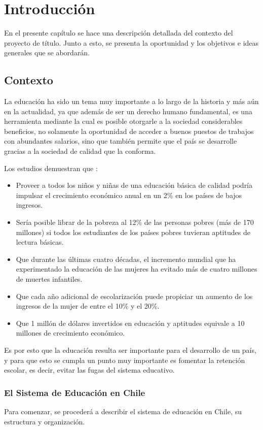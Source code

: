 \chapter{Introducción}
\label{ch:intro}
En el presente capítulo se hace una descripción detallada del contexto del proyecto de título. Junto a esto, se presenta la oportunidad y los objetivos e ideas generales que se abordarán.

\section{Contexto}
La educación ha sido un tema muy importante a lo largo de la historia y más aún en la actualidad, ya que además de ser un derecho humano fundamental, es una herramienta mediante la cual es posible otorgarle a la sociedad considerables beneficios, no solamente la oportunidad de acceder a buenos puestos de trabajos con abundantes salarios, sino que también permite que el país se desarrolle gracias a la sociedad de calidad que la conforma. 

Los estudios demuestran que \cite{unicef}:
\begin{itemize}
\item Proveer a todos los niños y niñas de una educación básica de calidad podría impulsar el crecimiento económico anual en un 2\% en los países de bajos ingresos.
\item Sería posible librar de la pobreza al 12\% de las personas pobres (más de 170 millones) si todos los estudiantes de los países pobres tuvieran aptitudes de lectura básicas.
\item Que durante las últimas cuatro décadas, el incremento mundial que ha experimentado la educación de las mujeres ha evitado más de cuatro millones de muertes infantiles.
\item Que cada año adicional de escolarización puede propiciar un aumento de los ingresos de la mujer de entre el 10\% y el 20\%.
\item Que 1 millón de dólares invertidos en educación y aptitudes equivale a 10 millones de crecimiento económico.
\end{itemize}

Es por esto que la educación resulta ser importante para el desarrollo de un país, y para que esto se cumpla un punto muy importante es fomentar la retención escolar, es decir, evitar las fugas del sistema educativo. 

\subsection{El Sistema de Educación en Chile}
Para comenzar, se procederá a describir el sistema de educación en Chile, su estructura y organización.

